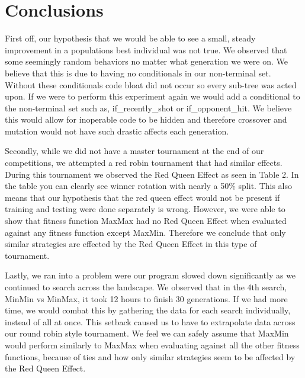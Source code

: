 \documentclass{acm_proc_article-sp}
\begin{document}
\section{Conclusions} %

First off, our hypothesis that we would be able to see a small, steady improvement in a populations best individual was not true. We observed that some seemingly random behaviors no matter what generation we were on. We believe that this is due to having no conditionals in our non-terminal set. Without these conditionals code bloat did not occur so every sub-tree was acted upon. If we were to perform this experiment again we would add a conditional to the non-terminal set such as, if\_recently\_shot or if\_opponent\_hit. We believe this would allow for inoperable code to be hidden and therefore crossover and mutation would not have such drastic affects each generation.

Secondly, while we did not have a master tournament\cite{Red} at the end of our competitions, we attempted a red robin tournament that had similar effects. During this tournament we observed the Red Queen Effect as seen in Table 2. %
In the table you can clearly see winner rotation with nearly a 50\% split. This also means that our hypothesis that the red queen effect would not be present if training and testing were done separately is wrong. However, we were able to show that fitness function MaxMax had no Red Queen Effect when evaluated against any fitness function except MaxMin. Therefore we conclude that only similar strategies are effected by the Red Queen Effect in this type of tournament.

Lastly, we ran into a problem were our program slowed down significantly as we continued to search across the landscape. We observed that in the 4th search, MinMin vs MinMax, it took 12 hours to finish 30 generations. If we had more time, we would combat this by gathering the data for each search individually, instead of all at once. This setback caused us to have to extrapolate data across our round robin style tournament. We feel we can safely assume that MaxMin would perform similarly to MaxMax when evaluating against all the other fitness functions, because of ties and how only similar strategies seem to be affected by the Red Queen Effect.
\end{document}
